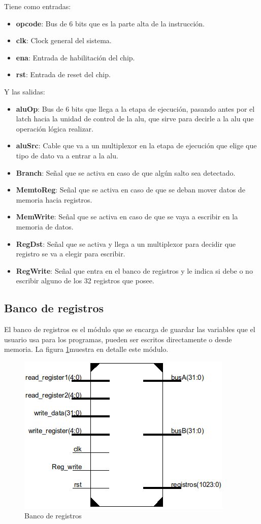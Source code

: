 Tiene como entradas:
\begin{itemize}
  \item \textbf{opcode}: Bus de 6 bits que es la parte alta de la instrucci\'on.
  \item \textbf{clk}: Clock general del sistema.
  \item \textbf{ena}: Entrada de habilitaci\'on del chip.
  \item \textbf{rst}: Entrada de reset del chip.
\end{itemize}

Y las salidas:
\begin{itemize}
  \item \textbf{aluOp}: Bus de 6 bits que llega a la etapa de ejecuci\'on, pasando antes por el latch hacia la unidad de control de la alu, que sirve para decirle a la alu que operaci\'on l\'ogica realizar.
  \item \textbf{aluSrc}: Cable que va a un multiplexor en la etapa de ejecuci\'on que elige que tipo de dato va a entrar a la alu.
  \item \textbf{Branch}: Señal que se activa en caso de que alg\'un salto sea detectado.
  \item \textbf{MemtoReg}: Señal que se activa en caso de que se deban mover datos de memoria hacia registros.
  \item \textbf{MemWrite}: Señal que se activa en caso de que se vaya a escribir en la memoria de datos.
  \item \textbf{RegDst}: Señal que se activa y llega a un multiplexor para decidir que registro se va a elegir para escribir.
  \item \textbf{RegWrite}: Señal que entra en el banco de registros y le indica si debe o no escribir alguno de los 32 registros que posee. 	
\end{itemize}

\subsection{Banco de registros}
El banco de registros es el m\'odulo que se encarga de guardar las variables que el usuario usa para los programas, pueden ser escritos directamente o desde memoria. La figura \ref{fig:registros}muestra en detalle este m\'odulo.

\begin{figure}[H]
\centering
\includegraphics[scale=0.5]{img/banco_registros}
\caption{Banco de registros}
\label{fig:registros}
\end{figure} 

